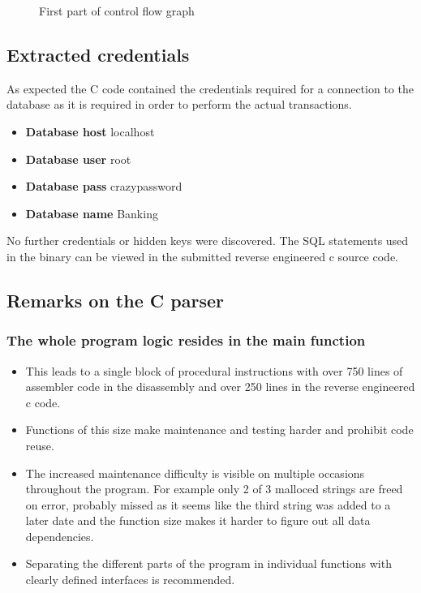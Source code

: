 \begin{figure}[h!tbp]
	\caption{First part of control flow graph}
	\label{figure:re_cfg}
\end{figure}

\subsection{Extracted credentials}
As expected the C code contained the credentials required for a connection to
the database as it is required in order to perform the actual transactions.
\begin{itemize}
	\item \textbf{Database host} localhost
	\item \textbf{Database user} root
	\item \textbf{Database pass} crazypassword
	\item \textbf{Database name} Banking
\end{itemize}
No further credentials or hidden keys were discovered. The SQL statements used
in the binary can be viewed in the submitted reverse engineered c source code.

\subsection{Remarks on the C parser}
\subsubsection*{The whole program logic resides in the main function}
\begin{itemize}
	\item This leads to a single block of procedural instructions with
		over 750 lines of assembler code in the disassembly and over 250
		lines in the reverse engineered c code.
	\item Functions of this size make maintenance and testing harder
		and prohibit code reuse.
	\item The increased maintenance difficulty is visible on multiple
		occasions throughout the program. For example only 2 of 3
		malloced strings are freed on error, probably missed as it seems
		like the third string was added to a later date and the
		function size makes it harder to figure out all data
		dependencies.
	\item Separating the different parts of the program in individual
		functions with clearly defined interfaces is recommended.
\end{itemize}

